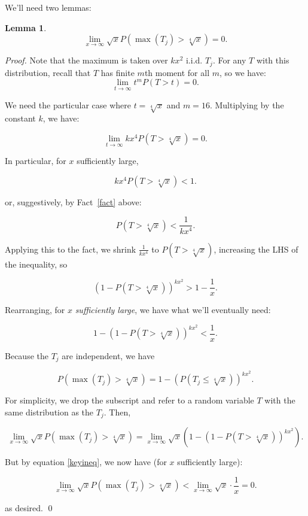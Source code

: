 \documentclass[11pt]{article}
\newtheorem{lemma}[theorem]{Lemma}
\theoremstyle{definition}
\begin{document}
We'll need two lemmas:
\begin{lemma}
\label{lem:Tmax}
    \[\lim_{x\rightarrow \infty} \sqrt{x}P\left(\max(T_j)>\sqrt[4]{x}\right)=0.\]
\end{lemma}
\begin{proof}
Note that the maximum is taken over $kx^2$ i.i.d. $T_j$.  For any $T$ with this distribution, recall that $T$ has finite $m$th moment for all $m$, so we have:
\[\lim_{t\rightarrow \infty} t^mP\left(T>t\right)=0.\]

We need the particular case where $t=\sqrt[4]{x}$ and $m=16$.  Multiplying by the constant $k$, we have:

\[\lim_{t\rightarrow \infty} kx^4P\left(T>\sqrt[4]{x}\right)=0.\]

In particular, for $x$ sufficiently large,

\[kx^4P\left(T>\sqrt[4]{x}\right) < 1.\]

or, suggestively, by Fact~\ref{fact} above:

\[P\left(T>\sqrt[4]{x}\right) < \frac{1}{kx^4}.\]

Applying this to the fact, we shrink $\frac{1}{kx^4}$ to $P\left(T>\sqrt[4]{x}\right)$, increasing the LHS of the inequality, so

\[\left(1-P\left(T>\sqrt[4]{x}\right)\right)^{kx^2} > 1 - \frac{1}{x}.\]

Rearranging, for $x$ \textit{sufficiently large}, we have what we'll eventually need:

\begin{equation}
    \label{keyineq}
1-\left(1-P\left(T>\sqrt[4]{x}\right)\right)^{kx^2} < \frac{1}{x}.
\end{equation}

Because the $T_j$ are independent, we have

\[ P\left(\max(T_j)>\sqrt[4]{x}\right) = 1 - \left(P\left(T_j \le \sqrt[4]{x}\right)\right)^{kx^2}. \]

For simplicity, we drop the subscript and refer to a random variable $T$ with the same distribution as the $T_j$.  Then,

\[\lim_{x\rightarrow \infty} \sqrt{x}P\left(\max(T_j)>\sqrt[4]{x}\right) =\lim_{x\rightarrow \infty}\sqrt{x}\left( 1 -  \left(1 -P\left(T > \sqrt[4]{x}\right)\right)^{kx^2} \right).\]

But by equation \ref{keyineq}, we now have (for $x$ sufficiently large):

\[\lim_{x\rightarrow \infty} \sqrt{x}P\left(\max(T_j)>\sqrt[4]{x}\right) < \lim_{x\rightarrow \infty}\sqrt{x} \cdot \frac{1}{x} =0.\]

as desired. \qed
\end{proof}
\end{document}
